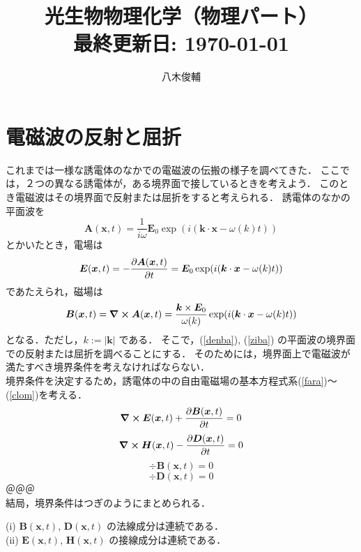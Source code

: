 \documentclass{jsarticle}
\title{{光生物物理化学（物理パート） \\[2ex]\large 最終更新日: \today}}
\author{八木俊輔}
\date{}
\numberwithin{equation}{section}
\theoremstyle{definition}
\begin{document}
\maketitle
\tableofcontents
\clearpage

\section{電磁波の反射と屈折}
これまでは一様な誘電体のなかでの電磁波の伝搬の様子を調べてきた．
ここでは，２つの異なる誘電体が，ある境界面で接しているときを考えよう．
このとき電磁波はその境界面で反射または屈折をすると考えられる．
誘電体のなかの平面波を
\begin{equation}
    \bm{A} (\bm{x}, t) = \frac{1}{i \omega} \bm{E}_0 \exp( i (\bm{k} \cdot \bm{x} - \omega (k) t) )
\end{equation}
とかいたとき，電場は
\begin{equation}
    \label{denba}
    \bm{E} (\bm{x}, t) = - \pdv{\bm{A} (\bm{x}, t)}{t} = \bm{E}_0 \exp( i (\bm{k} \cdot \bm{x} - \omega (k) t) )
\end{equation}
であたえられ，磁場は
\begin{equation}
    \label{ziba}
    \bm{B} (\bm{x}, t) = \curl{ \bm{A} (\bm{x}, t)} = \frac{\bm{k} \times \bm{E}_0}{\omega (k)} \exp( i (\bm{k} \cdot \bm{x} - \omega (k) t) )
\end{equation}
となる．ただし，$k := |\bm{k}|$ である．
そこで，(\ref{denba}), (\ref{ziba}) の平面波の境界面での反射または屈折を調べることにする．
そのためには，境界面上で電磁波が満たすべき境界条件を考えなければならない．\\
\quad 境界条件を決定するため，誘電体の中の自由電磁場の基本方程式系(\ref{fara})～(\ref{clom})を考える．
\begin{equation}
    \label{fara}
    \curl{ \bm{E} (\bm{x}, t) } + \pdv{\bm{B} (\bm{x}, t)}{t} = 0
\end{equation}
\begin{equation}
    \curl{ \bm{H} (\bm{x}, t) } - \pdv{\bm{D} (\bm{x}, t)}{t} = 0
\end{equation}
\begin{equation}
    \div{ \bm{B} (\bm{x}, t) } = 0
\end{equation}
\begin{equation}
    \label{clom}
    \div{ \bm{D} (\bm{x}, t) } = 0
\end{equation}
＠＠＠\\
\quad 結局，境界条件はつぎのようにまとめられる．
\begin{tcolorbox}[colback=white, colframe=black]
    (i)  $\bm{B} (\bm{x}, t)$, $\bm{D} (\bm{x}, t)$ の法線成分は連続である．\\
    (ii)  $\bm{E} (\bm{x}, t)$, $\bm{H} (\bm{x}, t)$ の接線成分は連続である．
\end{tcolorbox}
\end{document}
